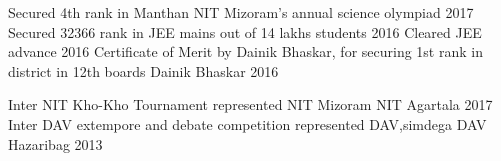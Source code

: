 \begin{cvhonors}
\cvhonor
    {Secured 4th rank in Manthan}
    {NIT Mizoram's annual science olympiad}
    {}
    {2017}
  \cvhonor
    {Secured 32366 rank in JEE mains}
    {out of 14 lakhs students}
    {}
    {2016}
  \cvhonor
    {Cleared JEE advance }
    {}
    {}
    {2016}
  \cvhonor
    {Certificate of Merit}
    {by Dainik Bhaskar, for securing 1st rank in district in 12th boards}
    {Dainik Bhaskar}
    {2016}
\end{cvhonors}

\begin{cvhonors}
  \cvhonor
    {Inter NIT Kho-Kho Tournament}
    {represented NIT Mizoram}
    {NIT Agartala}
    {2017}
  \cvhonor
    {Inter DAV extempore and debate competition}
    {represented DAV,simdega}
    {DAV Hazaribag}
    {2013}
\end{cvhonors}